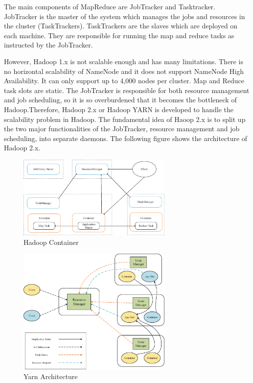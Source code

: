 The main components of MapReduce are JobTracker and Tasktracker. JobTracker is the master of the system which manages the jobs and resources in the cluster (TaskTrackers).  TaskTrackers are the slaves which are deployed on each machine. They are responsible for running the map and reduce tasks as instructed by the JobTracker.

However, Hadoop 1.x  is not scalable enough and has many limitations. There is no horizontal scalability of NameNode and it does not support NameNode High Availability. It can only support up to 4,000 nodes per cluster. Map and Reduce task slots are static. The JobTracker is responsible for both resource management and job scheduling, so it is so overburdened that it becomes the bottleneck of Hadoop.Therefore, Hadoop 2.x or Hadoop YARN is developed to handle the scalability problem in Hadoop. The fundamental idea of Haoop 2.x is to split up the two major functionalities of the JobTracker, resource management and job scheduling, into separate daemons. The following figure shows the architecture of Hadoop 2.x.

\begin{figure}[t]
  \centering
  \includegraphics[width=3in]{figs/Container.eps}
  \caption{Hadoop Container}
  \label{fig:overview}
\end{figure}


\begin{figure}[t]
  \centering
  \includegraphics[width=3in]{figs/yarn.eps}
  \caption{Yarn Architecture}
  \label{fig:overview}
\end{figure}


